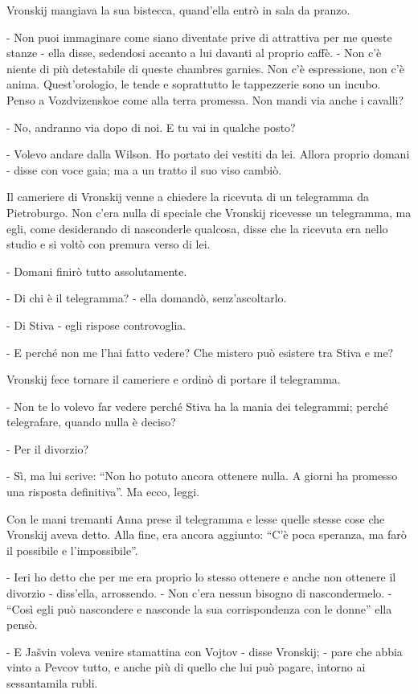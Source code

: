 Vronskij mangiava la sua bistecca, quand'ella entrò in sala da pranzo. 

- Non puoi immaginare come siano diventate prive di attrattiva per me queste stanze - ella disse, sedendosi accanto a lui davanti al proprio caffè. - Non c'è niente di più detestabile di queste chambres garnies. Non c'è espressione, non c'è anima. Quest'orologio, le tende e soprattutto le tappezzerie sono un incubo. Penso a Vozdvizenskoe come alla terra promessa. Non mandi via anche i cavalli? 

- No, andranno via dopo di noi. E tu vai in qualche posto? 

- Volevo andare dalla Wilson. Ho portato dei vestiti da lei. Allora proprio domani - disse con voce gaia; ma a un tratto il suo viso cambiò. 

Il cameriere di Vronskij venne a chiedere la ricevuta di un telegramma da Pietroburgo. Non c'era nulla di speciale che Vronskij ricevesse un telegramma, ma egli, come desiderando di nasconderle qualcosa, disse che la ricevuta era nello studio e si voltò con premura verso di lei. 

- Domani finirò tutto assolutamente. 

- Di chi è il telegramma? - ella domandò, senz'ascoltarlo. 

- Di Stiva - egli rispose controvoglia. 

- E perché non me l'hai fatto vedere? Che mistero può esistere tra Stiva e me? 

Vronskij fece tornare il cameriere e ordinò di portare il telegramma. 

- Non te lo volevo far vedere perché Stiva ha la mania dei telegrammi; perché telegrafare, quando nulla è deciso? 

- Per il divorzio? 

- Sì, ma lui scrive: ``Non ho potuto ancora ottenere nulla. A giorni ha promesso una risposta definitiva''. Ma ecco, leggi. 

Con le mani tremanti Anna prese il telegramma e lesse quelle stesse cose che Vronskij aveva detto. Alla fine, era ancora aggiunto: ``C'è poca speranza, ma farò il possibile e l'impossibile''. 

- Ieri ho detto che per me era proprio lo stesso ottenere e anche non ottenere il divorzio - diss'ella, arrossendo. - Non c'era nessun bisogno di nascondermelo. - ``Così egli può nascondere e nasconde la sua corrispondenza con le donne'' ella pensò. 

- E Jašvin voleva venire stamattina con Vojtov - disse Vronskij; - pare che abbia vinto a Pevcov tutto, e anche più di quello che lui può pagare, intorno ai sessantamila rubli. 

